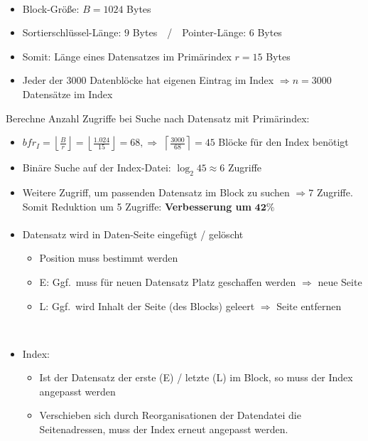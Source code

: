 \begin{frame}{\insertsection}
\framesubtitle{\insertsubsection}
\abs
{}
\begin{itemize}
\item Block-Größe: $B=1024$ Bytes
\item Sortierschlüssel-Länge: $9$ Bytes$\quad$/$\quad$Pointer-Länge: $6$ Bytes
\item Somit: L\"ange eines Datensatzes im Prim\"arindex $r=15$ Bytes
\item Jeder der $3000$ Datenbl\"ocke hat eigenen Eintrag im Index $\Rightarrow n=3000$ Datens\"atze im Index
\end{itemize}
\abs
\pause
Berechne Anzahl Zugriffe bei Suche nach Datensatz mit Prim\"arindex:
\begin{itemize}
\item $bfr_I=\left \lfloor\frac{B}{r}\right\rfloor =\left \lfloor\frac{1.024}{15}\right\rfloor = 68, \Rightarrow$ 
$\left\lceil\frac{3000}{68}\right\rceil = 45$ Bl\"ocke für den Index benötigt
\pause
\item Binäre Suche auf der Index-Datei: $\log_2 45 \approx 6$ Zugriffe
\pause
\item Weitere Zugriff, um passenden Datensatz im Block zu suchen $\Rightarrow 7$ Zugriffe. 
Somit Reduktion um 5 Zugriffe: \textbf{Verbesserung um} $\mathbf{42\%}$ 
\end{itemize}
\end{frame}

\begin{frame}{\insertsection}
\framesubtitle{\insertsubsection}
\abs
{}
\begin{itemize}
	\item Datensatz wird in Daten-Seite eingef\"ugt / gel\"oscht
	\begin{itemize}
		\item Position muss bestimmt werden 
		\item E: Ggf.~muss für neuen Datensatz Platz geschaffen werden $\Rightarrow$ neue Seite
		\item L: Ggf.~wird Inhalt der Seite (des Blocks) geleert $\Rightarrow$ Seite entfernen
	\end{itemize}
	\ \\[4pt]
	\item Index:
	\begin{itemize}
		\item Ist der Datensatz der erste (E) / letzte (L) im Block, so muss der Index angepasst werden
		\item Verschieben sich durch Reorganisationen der Datendatei die Seitenadressen, muss der Index erneut angepasst werden.
	\end{itemize}
\end{itemize}
\end{frame}

